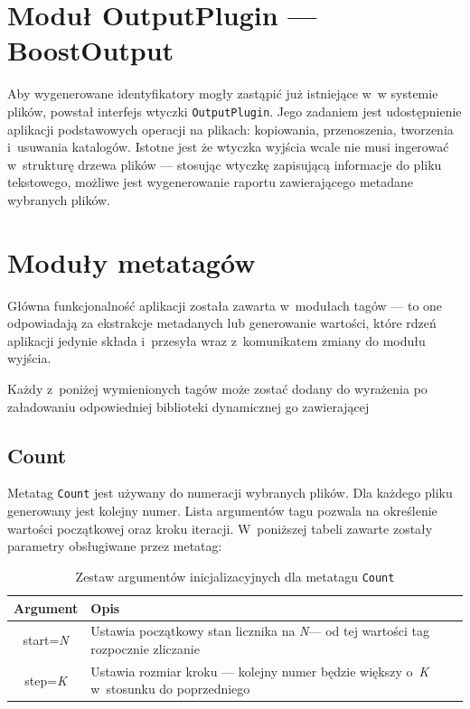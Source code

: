 \section{Moduł OutputPlugin --- BoostOutput}
\par
Aby wygenerowane identyfikatory mogły zastąpić już istniejące w~w systemie plików, powstał interfejs wtyczki \texttt{OutputPlugin}. Jego zadaniem jest udostępnienie aplikacji podstawowych operacji na plikach: kopiowania, przenoszenia, tworzenia i~usuwania katalogów.
Istotne jest że wtyczka wyjścia wcale nie musi ingerować w~strukturę drzewa plików --- stosując wtyczkę zapisującą informacje do pliku tekstowego, możliwe jest wygenerowanie raportu zawierającego metadane wybranych plików.


\section{Moduły metatagów}
\par
Główna funkcjonalność aplikacji została zawarta w~modułach tagów --- to one odpowiadają za ekstrakcje metadanych lub generowanie wartości, które rdzeń aplikacji jedynie składa i~przesyła wraz z~komunikatem zmiany do modułu wyjścia.
\par
Każdy z~poniżej wymienionych tagów może zostać dodany do wyrażenia po załadowaniu odpowiedniej biblioteki dynamicznej go zawierającej

\subsection{Count}
\par
Metatag \texttt{Count} jest używany do numeracji wybranych plików.
Dla każdego pliku generowany jest kolejny numer. Lista argumentów tagu pozwala na określenie wartości początkowej oraz kroku iteracji.
W~poniższej tabeli zawarte zostały parametry obsługiwane przez metatag:
\begin{table}[h]
\begin{center}
\begin{tabular}{| c | p{13cm} |}
\hline
\textbf{Argument} & \textbf{Opis} \\
\hline
start=\textit{N} & Ustawia początkowy stan licznika na \textit{N}--- od tej wartości tag rozpocznie zliczanie \\
step=\textit{K} & Ustawia rozmiar kroku --- kolejny numer będzie większy o~\textit{K} w~stosunku do poprzedniego \\
\hline
\end{tabular} \end{center}
\caption{Zestaw argumentów inicjalizacyjnych dla metatagu \texttt{Count}}
\end{table}

